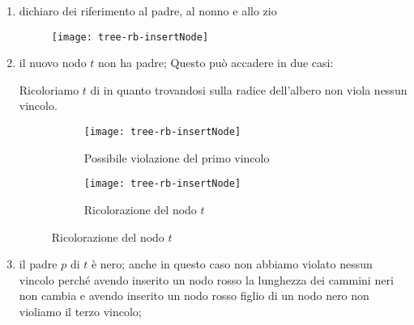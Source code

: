 \clearpage
\begin{algorithm}[H]
	\caption{Bilanciamento dell'albero in seguito all'inserimento di un nodo rosso}
	\setcounter{AlgoLine}{0}
	
\end{algorithm}

\clearpage
\begin{enumerate}[label={\footnotesize\ttfamily (\arabic*)}, start=0]

	\vspace{-5pt}
	\item dichiaro dei riferimento al padre, al nonno e allo zio
	\begin{figure}[H]\centering
		\texttt{[image: tree-rb-insertNode]}
	\end{figure}

	\vspace{-5pt}
	\item il nuovo nodo \(t\) non ha padre; Questo può accadere in due casi:
	Ricoloriamo \(t\) di \BLACK in quanto trovandosi sulla radice dell'albero non viola nessun vincolo.

	\vspace{-5pt}
	\begin{figure}[H]\centering
		\begin{subfigure}[t]{.5\textwidth}\centering
			\texttt{[image: tree-rb-insertNode]}
			\caption{Possibile violazione del primo vincolo}
		\end{subfigure}%
		\begin{subfigure}[t]{.5\textwidth}\centering
			\texttt{[image: tree-rb-insertNode]}
			\caption{Ricolorazione del nodo \(t\)}
		\end{subfigure}
	\end{figure}

	\vspace{-5pt}
	\item il padre \(p\) di \(t\) è nero; anche in questo caso non abbiamo violato nessun vincolo perché avendo inserito un nodo rosso la lunghezza dei cammini neri non cambia e avendo inserito un nodo rosso figlio di un nodo nero non violiamo il terzo vincolo;


\end{enumerate}
